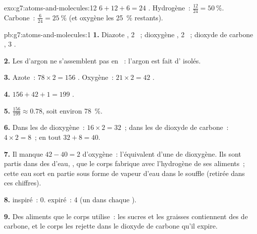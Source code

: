 \begin{solution}{exo:g7:atoms-and-molecules:12}
$6 + 12 + 6 = 24$ . Hydrogène~: $\frac{12}{24} = \qty{50}{\percent}$.
Carbone~: $\frac{6}{24} = \qty{25}{\percent}$ (et oxygène les
\qty{25}{\percent} restants).
\end{solution}

\begin{solution}{pb:g7:atoms-and-molecules:1}
\textbf{1.} Diazote , 2 ~; dioxygène , 2 ~;
dioxyde de carbone , 3 .

\textbf{2.} Les  d'argon ne s'assemblent pas en ~:
l'argon est fait d' isolés.

\textbf{3.} Azote~: $78 \times 2 = 156$ . Oxygène~: $21\times 2 =
42$ .

\textbf{4.} $156 + 42 + 1 = 199$ .

\textbf{5.} $\frac{156}{199} \approx 0.78$, soit environ
\qty{78}{\percent}.

\textbf{6.} Dans les  de dioxygène~: $16\times 2 = 32$~; dans
les  de dioxyde de carbone~: $4 \times 2 = 8$~; en tout
$32 + 8 = 40$.

\textbf{7.} Il manque $42 - 40 = 2$  d'oxygène~: l'équivalent
d'une  de dioxygène. Ils sont partis dans des  d'eau,
, que le corps fabrique avec l'hydrogène de ses aliments~; cette
eau sort en partie sous forme de vapeur d'eau dans le souffle (retirée
dans ces chiffres).

\textbf{8.}  inspiré~: 0.  expiré~: 4 (un dans chaque ).

\textbf{9.} Des aliments que le corps utilise~: les sucres et les
graisses contiennent des  de carbone, et le corps les rejette dans
le dioxyde de carbone qu'il expire.


\end{solution}
